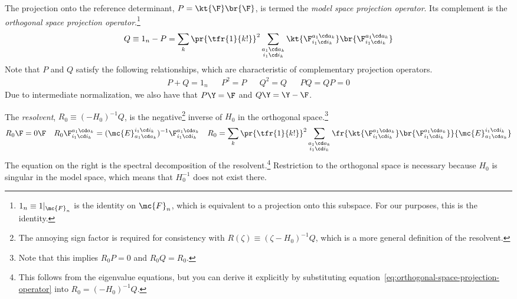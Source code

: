 \begin{dfn}
The projection onto the reference determinant, $P=\kt{\F}\br{\F}$, is termed the \textit{model space projection operator}.
Its complement is the \textit{orthogonal space projection operator}.\footnote{$1_n\equiv 1|_{\mc{F}_n}$ is the identity on $\mc{F}_n$, which is equivalent to a projection onto this subspace.  For our purposes, this is the identity.}
\begin{align}
\label{eq:orthogonal-space-projection-operator}
  Q
\equiv
  1_n
-
  P
=
  \sum_k
  \pr{
    \tfr{1}{k!}
  }^2
  \sum_{\substack{a_1\cd a_k\\i_1\cd i_k}}
  \kt{\F_{i_1\cd i_k}^{a_1\cd a_k}}
  \br{\F_{i_1\cd i_k}^{a_1\cd a_k}}
\end{align}
Note that $P$ and $Q$ satisfy the following relationships, which are characteristic of complementary projection operators.
\begin{align}
  P
+
  Q
=
  1_n
&&
  P^2
=
  P
&&
  Q^2
=
  Q
&&
  PQ
=
  QP
=
  0
\end{align}
Due to intermediate normalization, we also have that
$
  P\Y
=
  \F
$
and
$
  Q\Y
=
  \Y
-
  \F
$.
\end{dfn}

\begin{samepage}
\begin{dfn}
The \textit{resolvent},
$
  R_0
\equiv
  (-H_0)^{-1}Q
$, is the negative\footnote{The annoying sign factor is required for consistency with $R(\zeta)\equiv(\zeta-H_0)^{-1}Q$, which is a more general definition of the resolvent.} inverse of $H_0$ in the orthogonal space.\footnote{Note that this implies $R_0P=0$ and $R_0Q=R_0$.}
\begin{align}
\label{eq:resolvent-spectral-decomposition}
  R_0
  \F
=
  0
  \F
&&
  R_0
  \F_{i_1\cd i_k}^{a_1\cd a_k}
=
  (\mc{E}_{a_1\cd a_k}^{i_1\cd i_k})^{-1}
  \F_{i_1\cd i_k}^{a_1\cd a_k}
&&
  R_0
=
  \sum_k
  \pr{\tfr{1}{k!}}^2
  \sum_{\substack{a_1\cd a_k\\i_1\cd i_k}}
  \fr{
    \kt{\F_{i_1\cd i_k}^{a_1\cd a_k}}
    \br{\F_{i_1\cd i_k}^{a_1\cd a_k}}
  }{
    \mc{E}_{a_1\cd a_k}^{i_1\cd i_k}
  }
\end{align}
The equation on the right is the spectral decomposition of the resolvent.\footnote{This follows from the eigenvalue equations, but you can derive it explicitly by substituting equation~\ref{eq:orthogonal-space-projection-operator} into $R_0=(-H_0)^{-1}Q$.}
Restriction to the orthogonal space is necessary because $H_0$ is singular in the model space, which means that $H_0^{-1}$ does not exist there.
\end{dfn}
\end{samepage}

